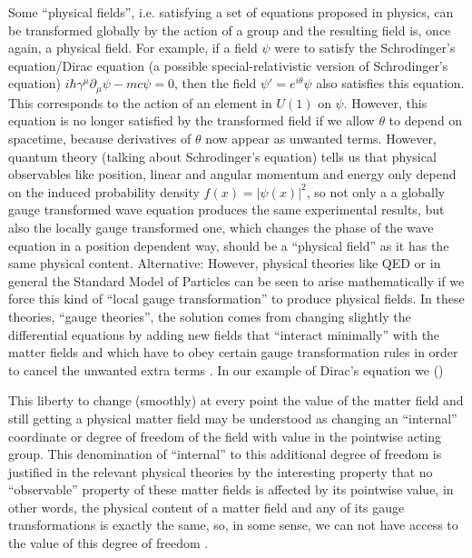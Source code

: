 Some ``physical fields'', i.e. satisfying a set of equations proposed in physics, can be transformed globally by the action of a group and the resulting field is, once again, a physical field. For example, if a field $\psi$ were to satisfy the Schrodinger's equation/Dirac equation (a possible special-relativistic version of Schrodinger's equation) $i \hbar \gamma^\mu \partial_\mu \psi - mc \psi = 0$, then the field $\psi ' = e^{i \theta} \psi$ also satisfies this equation. This corresponds to the action of an element in $U(1)$ on $\psi$. However, this equation is no longer satisfied by the transformed field if we allow $\theta$ to depend on spacetime, because derivatives of $\theta$ now appear as unwanted terms. However, quantum theory (talking about Schrodinger's equation) tells us that physical observables like position, linear and angular momentum and energy only depend on the induced probability density $f(x) = |\psi(x)|^2$, so not only a a globally gauge transformed wave equation produces the same experimental results, but also the locally gauge transformed one, which changes the phase of the wave equation in a position dependent way, should be a ``physical field'' as it has the same physical content.  Alternative: However, physical theories like QED or in general the Standard Model of Particles can be seen to arise mathematically if we force this kind of ``local gauge transformation'' to produce physical fields. In these theories, ``gauge theories'', the solution comes from changing slightly the differential equations by adding new fields that ``interact minimally'' with the matter fields and which have to obey certain gauge transformation rules in order to cancel the unwanted extra terms . In our example of Dirac's equation we  
 ()

This liberty to change (smoothly) at every point the value of the matter field and still getting a physical matter field may be understood as changing an ``internal'' coordinate or degree of freedom of the field with value in the pointwise acting group. This denomination of ``internal'' to this additional degree of freedom is justified in the relevant physical theories by the interesting property that no ``observable'' property of these matter fields is affected by its pointwise value, in other words, the physical content of a matter field and any of its gauge transformations is exactly the same, so, in some sense, we can not have access to the value of this degree of freedom  . 

